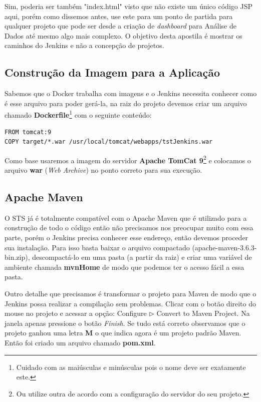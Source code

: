 \documentclass[a4paper,11pt]{article}
\begin{document}
Sim, poderia ser também "index.html" visto que não existe um único código JSP aqui, porém como dissemos antes, use este para um ponto de partida para qualquer projeto que pode ser desde a criação de \textit{dashboard} para Análise de Dados até mesmo algo mais complexo. O objetivo desta apostila é mostrar os caminhos do Jenkins e não a concepção de projetos.

\subsection{Construção da Imagem para a Aplicação}
Sabemos que o Docker trabalha com imagens e o Jenkins necessita conhecer como é esse arquivo para poder gerá-la, na raiz do projeto devemos criar um arquivo chamado \textbf{Dockerfile}\footnote{Cuidado com as maiúsculas e minúsculas pois o nome deve ser exatamente este.} com o seguinte conteúdo:
\begin{lstlisting}
FROM tomcat:9
COPY target/*.war /usr/local/tomcat/webapps/tstJenkins.war
\end{lstlisting}

Como base usaremos a imagem do servidor \textbf{Apache TomCat 9}\footnote{Ou utilize outra de acordo com a configuração do servidor do seu projeto.} e colocamos o arquivo \textbf{war} (\textit{Web Archive}) no ponto correto para sua execução.

\subsection{Apache Maven}
O STS já é totalmente compatível com o Apache Maven\cite{maven} que é utilizado para a construção de todo o código então não precisamos nos preocupar muito com essa parte, porém o Jenkins precisa conhecer esse endereço, então devemos proceder sua instalação. Para isso basta baixar o arquivo compactado (apache-maven-3.6.3-bin.zip), descompactá-lo em uma pasta (a partir da raiz) e criar uma variável de ambiente chamada \textbf{mvnHome} de modo que podemos ter o acesso fácil a essa pasta.

Outro detalhe que precisamos é transformar o projeto para Maven de modo que o Jenkins possa realizar a compilação sem problemas. Clicar com o botão direito do mouse no projeto e acessar a opção: Configure $\triangleright$ Convert to Maven Project. Na janela apenas pressione o botão \textit{Finish}. Se tudo está correto observamos que o projeto ganhou uma letra \textbf{M} o que indica agora é um projeto padrão Maven. Então foi criado um arquivo chamado \textbf{pom.xml}.
\end{document}
